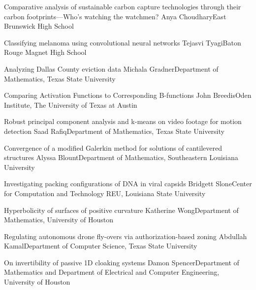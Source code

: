 \begin{postersPH}

\item\poster %
{Comparative analysis of sustainable carbon capture technologies through their carbon footprints---Who's watching the watchmen?}
{Anya Choudhary}{East Brunswick High School}

\item\poster %
{Classifying melanoma using convolutional neural networks}
{Tejasvi Tyagi}{Baton Rouge Magnet High School}

\end{postersPH}


\begin{postersPU}

\item\poster %
{Analyzing Dallas County eviction data}
{Michala Gradner}{Department of Mathematics, Texas State University}

\item\poster %
{Comparing Activation Functions to Corresponding B-functions}
{John Breedis}{Oden Institute, The University of Texas at Austin}

\item\poster %
{Robust principal component analysis and k-means on video footage for motion detection}
{Saad Rafiq}{Department of Mathematics, Texas State University}

\item\poster %
{Convergence of a modified Galerkin method for solutions of cantilevered structures}
{Alyssa Blount}{Department of Mathematics, Southeastern Louisiana University}

\item\poster %
{Investigating packing configurations of DNA in viral capsids}
{Bridgett Slone}{Center for Computation and Technology REU, Louisiana State University}

\item\poster %
{Hyperbolicity of surfaces of positive curvature}
{Katherine Wong}{Department of Mathematics, University of Houston}

\item\poster %
{Regulating autonomous drone fly-overs via authorization-based zoning}
{Abdullah Kamal}{Department of Computer Science, Texas State University}

\item\poster %
{On invertibility of passive 1D cloaking systems}
{Damon Spencer}{Department of Mathematics and Department of Electrical and Computer Engineering, University of Houston}


\end{postersPU}
